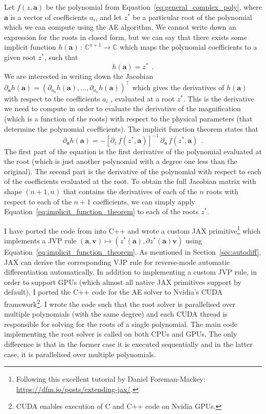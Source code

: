 \documentclass[12pt,dvipsnames]{report}
\newcommand{\ssf}[1]{\textsf{#1}}
\renewcommand{\vec}[1]{\boldsymbol{\mathbf{#1}}}
\newcommand{\hquad}{~~}
\begin{document}
Let $f(z, \vec{a})$ be the polynomial from Equation~\ref{eq:general_complex_poly}, where 
$\vec{a}$ is a vector of coefficients $a_i$, and let $z^*$ be a particular root of the 
polynomial which we can compute using the AE algorithm. We cannot write down an
expression for the roots in closed form, but we can say that there exists some
implicit function $h(\vec a)\,:\,\mathbb{C}^{n+1}\rightarrow\mathbb{C}$ which maps the 
polynomial coefficients to a given root $z^*$, such that
\begin{equation}
    h(\vec{a})=z^*
    \hquad .
\end{equation}
 We are interested in writing down the
Jacobian $\partial_{\vec a} h(\vec{a})=(\partial_{a_0} h(\vec a),\ldots,\partial_{a_n} h(\vec{a}))^\intercal$ 
which gives the derivatives of $h(\vec{a})$ with respect to the
coefficients $a_i$ , evaluated at a root $z^*$. This is the derivative we need 
to compute in order to evaluate the derivative of the magnification
(which is a function of the roots) with respect to the physical parameters
(that determine the polynomial coefficients). The implicit function theorem
states that
\begin{equation}
    \partial_{\vec a}h(\vec{a})=-\left[\partial_z\,f(z^*,\vec{a})\right]^{-1}\,\partial_{\vec a}\,f (z^*,\vec a) 
    \hquad .
    \label{eq:implicit_function_theorem}
\end{equation}
The first part of the equation is the first derivative of the polynomial evaluated at the
root (which is just another polynomial with a degree one less than the original).
The second part is the derivative of the polynomial with respect to each of the
coefficients evaluated at the root. To obtain the full Jacobian matrix  with shape 
$(n+1, n)$ that contains the  derivatives of each of the $n$ roots with respect to each of 
the $n+1$ coefficients, we can simply apply Equation~\ref{eq:implicit_function_theorem} 
to each of the roots $z^*$. 

I have ported the code from \citet{cameron2021} into \ssf{C++} and wrote a custom \ssf{JAX}
primitive\footnote{Following this excellent tutorial by Daniel Foreman-Mackey: 
\url{https://dfm.io/posts/extending-jax/}.} which implements a JVP rule 
$\left(\vec{a}, \vec v\right) \mapsto\left(z^{*}\left(\vec a\right), \partial z^{*}\left(\vec a\right) \vec v\right)$
using Equation~\ref{eq:implicit_function_theorem}. As mentioned
in Section~\ref{sec:autodiff}, \ssf{JAX} can derive the corresponding VJP rule for 
reverse-mode automatic differentiation automatically. In addition to implementing a 
custom JVP rule, in order to support GPUs (which almost all native \ssf{JAX} primitives 
support by default), I ported the \ssf{C++} code  for the AE solver to Nvidia's 
\ssf{CUDA} framework\footnote{\ssf{CUDA} enables execution 
of \ssf{C} and \ssf{C++} code on Nvidia GPUs.}. I wrote the code such that the root 
solver is parallelised over multiple polynomials (with the same degree) and each \ssf{CUDA} thread is 
responsible for solving for the roots of a single polynomial. The main code implementing the root solver is
called on both CPUs and GPUs.
The only difference is that in the former case it is 
executed sequentially and in the latter case, it is parallelised over multiple polynomials. 
\end{document}
